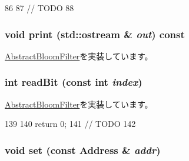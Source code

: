 \begin{DoxyCode}
86 {
87     // TODO
88 }
\end{DoxyCode}
\hypertarget{classLSB__CountingBloomFilter_ac55fe386a101fbae38c716067c9966a0}{
\subsubsection[{print}]{\setlength{\rightskip}{0pt plus 5cm}void print (std::ostream \& {\em out}) const}}
\label{classLSB__CountingBloomFilter_ac55fe386a101fbae38c716067c9966a0}


\hyperlink{classAbstractBloomFilter_a3ea5f7af5db62cc24f4e40df9ea5c971}{AbstractBloomFilter}を実装しています。\hypertarget{classLSB__CountingBloomFilter_a6f8a98d0f38a8d122d4cbf87323484eb}{
\subsubsection[{readBit}]{\setlength{\rightskip}{0pt plus 5cm}int readBit (const int {\em index})}}
\label{classLSB__CountingBloomFilter_a6f8a98d0f38a8d122d4cbf87323484eb}


\hyperlink{classAbstractBloomFilter_a6c0e9a098f0f210aa42eb2f1553804eb}{AbstractBloomFilter}を実装しています。


\begin{DoxyCode}
139 {
140     return 0;
141     // TODO
142 }
\end{DoxyCode}
\hypertarget{classLSB__CountingBloomFilter_a2b666fae2a5c2b98bc5cba8e1333bcc9}{
\subsubsection[{set}]{\setlength{\rightskip}{0pt plus 5cm}void set (const {\bf Address} \& {\em addr})}}
\label{classLSB__CountingBloomFilter_a2b666fae2a5c2b98bc5cba8e1333bcc9}


